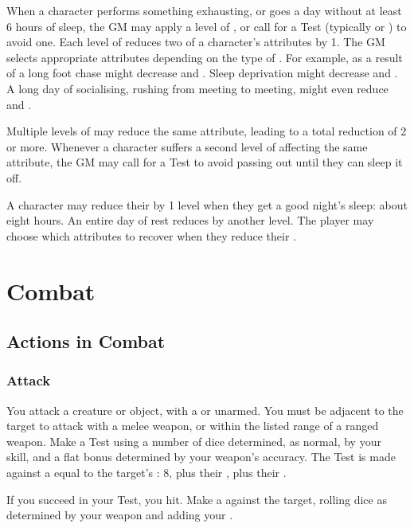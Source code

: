 When a character performs something exhausting, or goes a day without at least 6 hours of sleep, the GM may apply a level of {\exhaustion}, or call for a Test (typically  or ) to avoid one.
Each level of {\exhaustion} reduces two of a character's attributes by 1.
The GM selects appropriate attributes depending on the type of {\exhaustion}.
For example, {\exhaustion} as a result of a long foot chase might decrease  and .
Sleep deprivation might decrease  and .
A long day of socialising, rushing from meeting to meeting, might even reduce  and .

Multiple levels of {\exhaustion} may reduce the same attribute, leading to a total reduction of 2 or more.
Whenever a character suffers a second level of {\exhaustion} affecting the same attribute, the GM may call for a Test to avoid passing out until they can sleep it off.

A character may reduce their {\exhaustion} by 1 level when they get a good night's sleep: about eight hours.
An entire day of rest reduces {\exhaustion} by another level.
The player may choose which attributes to recover when they reduce their {\exhaustion}.

\section{Combat}

\subsection{Actions in Combat}

\subsubsection{Attack}

You attack a creature or object, with a  or unarmed.
You must be adjacent to the target to attack with a melee weapon, or within the listed range of a ranged weapon.
Make a Test using a number of dice determined, as normal, by your  skill, and a flat bonus determined by your weapon's accuracy.
The Test is made against a {\tn} equal to the target's : 8, plus their , plus their .

If you succeed in your Test, you hit.
Make a {\damagetest} against the target, rolling dice as determined by your weapon and adding your .

